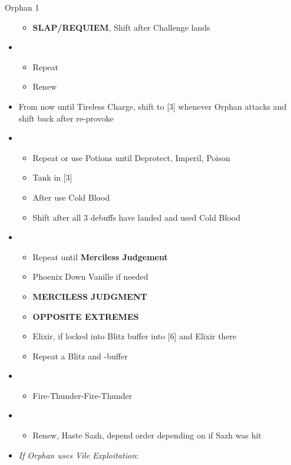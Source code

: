 \begin{battle}{Orphan 1}
\begin{multicols}{2}
\begin{itemize}
\begin{itemize}
        \item \textbf{SLAP/REQUIEM}, Shift after Challenge lands
    \end{itemize}
    \item \fifth
    \begin{itemize}
    	  \item Repeat
    	  \item Renew
    \end{itemize}
    \vfill\null
    \columnbreak
    \item From now until Tireless Charge, shift to [3] whenever Orphan attacks and shift back after re-provoke
    \item \fifth
    \begin{itemize}
        \item Repeat or use Potions until Deprotect, Imperil, Poison
        \item Tank in [3]
        \item After \stagger use Cold Blood
        \item Shift after all 3 debuffs have landed and used Cold Blood
    \end{itemize}
    \item \first
    \begin{itemize}
        \item Repeat until \textbf{Merciless Judgement}
        \item Phoenix Down Vanille if needed
        \item \textbf{MERCILESS JUDGMENT}
        \item \textbf{OPPOSITE EXTREMES}
        \item Elixir, if locked into Blitz buffer into [6] and Elixir there
        \item Repeat a Blitz and \rav-buffer
    \end{itemize}
    \item \sixth
    \begin{itemize}
        \item Fire-Thunder-Fire-Thunder
    \end{itemize}
    \item \fourth
    \begin{itemize}
        \item Renew, Haste Sazh, depend order depending on if Sazh was hit
    \end{itemize}
    \item \textit{If Orphan uses Vile Exploitation}:
    \begin{itemize}

\end{itemize}
\end{itemize}
\end{multicols}
\end{battle}
